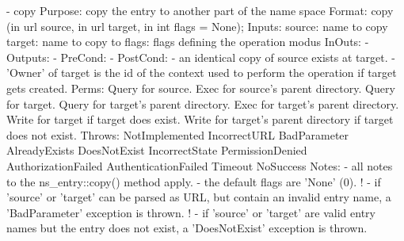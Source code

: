\begin{myspec}
    - copy
      Purpose:  copy the entry to another part of the name space
      Format:   copy               (in  url        source,
                                    in  url        target,
                                    in  int     flags = None);
      Inputs:   source:             name to copy
                target:             name to copy to
                flags:              flags defining the operation
                                    modus
      InOuts:   -
      Outputs:  -
      PreCond:  -
      PostCond: - an identical copy of source exists at target.
                - 'Owner' of target is the id of the context
                  used to perform the operation if target gets
                  created.
      Perms:    Query for source.
                Exec  for source's parent directory.
                Query for target.
                Query for target's parent directory.
                Exec  for target's parent directory.
                Write for target
                      if  target does exist.
                Write for target's parent directory 
                      if  target does not exist.
      Throws:   NotImplemented
                IncorrectURL
                BadParameter
                AlreadyExists
                DoesNotExist
                IncorrectState
                PermissionDenied
                AuthorizationFailed
                AuthenticationFailed
                Timeout
                NoSuccess
      Notes:    - all notes to the ns_entry::copy() method
                  apply.
                - the default flags are 'None' (0).
!               - if 'source' or 'target' can be parsed as URL, 
                  but contain an invalid entry name, a 
                  'BadParameter' exception is thrown.
!               - if 'source' or 'target' are valid entry names 
                  but the entry does not exist, a 'DoesNotExist'
                  exception is thrown.
 

\end{myspec}
